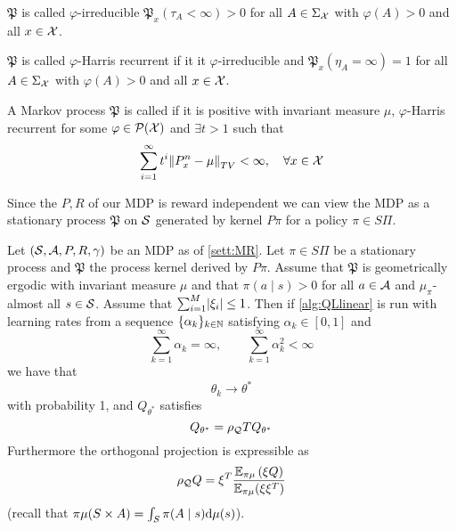 \begin{defn}[Irreducibility]
  $\mathfrak{P}$ is called $\varphi$-irreducible
  $\mathfrak{P}_x(\tau_A < \infty) > 0$
  for all $A \in \Sigma_\mathcal{X}$
  with $\varphi(A) > 0$
  and all $x \in \mathcal{X}$.
\end{defn}

\begin{defn}
  $\mathfrak{P}$ is called $\varphi$-Harris recurrent if
  it it $\varphi$-irreducible and
  $\mathfrak{P}_x(\eta_A = \infty) = 1$ for all $A \in \Sigma_\mathcal{X}$ with
  $\varphi(A) > 0$ and all $x \in \mathcal{X}$.
\end{defn}

\begin{defn}
  A Markov process $\mathfrak{P}$ is called  if
  it is positive with invariant measure $\mu$, $\varphi$-Harris recurrent
  for some $\varphi \in \mathcal{P}(\mathcal{X})$ and $\exists t>1$ such that
  \[ \sum_{i=1}^\infty t^i \norm{P^n_x - \mu}_{TV} < \infty,
  \quad \forall x \in \mathcal{X} \]
\end{defn}

Since the $P,R$ of our MDP is reward independent we can view the
MDP as a stationary process $\mathfrak{P}$ on $\mathcal{S}$
generated by kernel $P\pi$ for a policy $\pi \in S\Pi$.

\begin{thm}
  Let $(\mathcal{S}, \mathcal{A}, P, R, \gamma)$ be an MDP as of \cref{sett:MR}.
  Let $\pi \in S\Pi$ be a stationary process
  and $\mathfrak{P}$ the process kernel derived by $P\pi$.
  Assume that $\mathfrak{P}$ is geometrically ergodic with invariant
  measure $\mu$ and that
  $\pi(a \mid s) > 0$ for all $a \in \mathcal{A}$ and $\mu_\pi$-almost all
  $s \in \mathcal{S}$.
  Assume that $\sum_{i=1}^M \abs{\xi_i} \leq 1$.
  Then if \cref{alg:QLlinear} is run with learning rates from a sequence
  $\{ \alpha_k \}_{k \in \mathbb{N}}$ satisfying $\alpha_k \in [0,1]$ and
  \[ \sum_{k = 1}^\infty \alpha_k = \infty, \qquad
  \sum_{k = 1}^\infty \alpha_k^2 < \infty \]
  we have that
  \[ \theta_k \to \theta^* \]
  with probability 1, and $Q_{\theta^*}$ satisfies
  \[ Q_{\theta^*} = \rho_\mathcal{Q} T Q_{\theta^*} \]
  Furthermore the orthogonal projection is expressible as
  \[ \rho_\mathcal{Q} Q = \xi^T
    \frac{\mathbb{E}_{\pi\mu}\left( \xi Q \right)}{\mathbb{E}_{\pi\mu} (\xi \xi^T)}
  \]
  (recall that $\pi \mu(S \times A)
  = \int_S \pi(A \mid s) \mathrm{d} \mu(s)$).
\end{thm}



